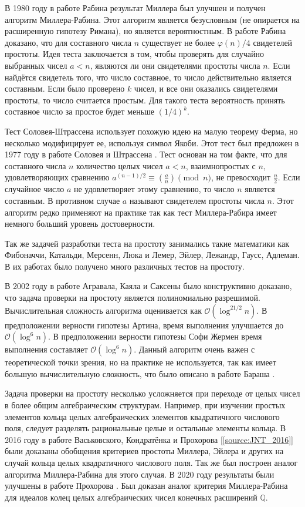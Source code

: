 \documentclass[_00_dissertation.tex]{subfiles}
\begin{document}
В 1980 году в работе Рабина \cite{source:Rabin} результат Миллера был улучшен и получен алгоритм Миллера-Рабина.
Этот алгоритм является безусловным (не опирается на расширенную гипотезу Римана), но является вероятностным.
В работе Рабина доказано, что для составного числа $n$ существует не более $\varphi(n)/4$ свидетелей простоты.
Идея теста заключается в том, чтобы проверять для случайно выбранных чисел $a < n$, являются ли они свидетелями простоты числа $n$.
Если найдётся свидетель того, что число составное, то число действительно является составным.
Если было проверено $k$ чисел, и все они оказались свидетелями простоты, то число считается простым.
Для такого теста вероятность принять составное число за простое будет меньше $(1/4)^{k}$.

Тест Соловея-Штрассена использует похожую идею на малую теорему Ферма, но несколько модифицирует ее, используя символ Якоби.
Этот тест был предложен в 1977 году в работе Соловея и Штрассена \cite{source:Solovay}.
Тест основан на том факте, что для составного числа $n$ количество целых чисел $a < n$, взаимнопростых с $n$, удовлетворяющих сравнению $a^{{(n-1)/2}}\equiv \left({\frac{a}{n}}\right){\pmod{n}}$, не превосходит $\frac{n}{2}$.
Если случайное число $a$ не удовлетворяет этому сравнению, то число $n$ является составным.
В противном случае $a$ называют свидетелем простоты числа $n$.
Этот алгоритм редко применяют на практике так как тест Миллера-Рабира имеет немного больший уровень достоверности.

Так же задачей разработки теста на простоту занимались такие математики как Фибоначчи, Катальди, Мерсенн, Люка и Лемер, Эйлер, Лежандр, Гаусс, Адлеман.
В их работах было получено много различных тестов на простоту.

В 2002 году в работе Агравала, Каяла и Саксены \cite{source:AKS} было конструктивно доказано, что задача проверки на простоту является полиномиально разрешимой.
Вычислительная сложность алгоритма оценивается как $\mathcal{O}(\log ^{21/2}n)$.
В предположении верности гипотезы Артина, время выполнения улучшается до $\mathcal{O}(\log ^{6}n)$.
В предположении верности гипотезы Софи Жермен время выполнения составляет $\mathcal{O}(\log ^{6}n)$.
Данный алгоритм очень важен с теоретической точки зрения, но на практике не используется, так как имеет большую вычислительную сложность, что было описано в работе Бараша \cite{source:Barash}.

Задача проверки на простоту несколько усложняется при переходе от целых чисел в более общим алгебраическим структурам.
Например, при изучении простых элементов кольца целых алгебраических элементов квадратичного числового поля, следует разделять рациональные целые и остальные элементы кольца.
В 2016 году в работе Васьковского, Кондратёнка и Прохорова [\ref{source:JNT_2016}] были доказаны обобщения критериев простоты Миллера, Эйлера и других на случай кольца целых квадратичного числового поля.
Так же был построен аналог алгоритма Миллера-Рабина для этого случая.
В 2020 году результаты были улучшены в работе Прохорова \cite{source:Prochorov}.
Был доказан аналог критерия Миллера-Рабина для идеалов колец целых алгебраических чисел конечных расширений $\mathbb{Q}$.
\end{document}
